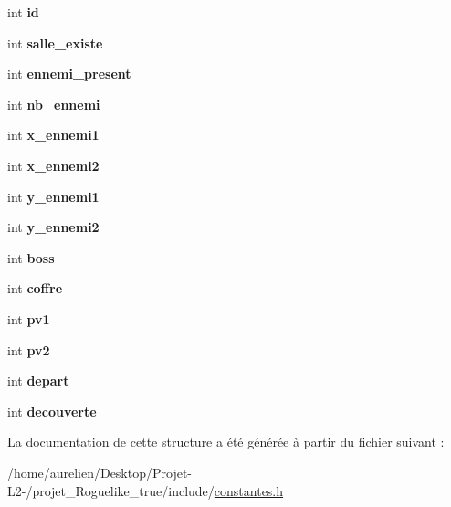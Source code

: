 \begin{DoxyCompactItemize}
\item 
\mbox{\label{structsalle__s_a875e8df0e9b8fd190dc4d210e49a03bb}} 
int {\bfseries id}
\item 
\mbox{\label{structsalle__s_ad82fc1e9e39f7a39b7fc26ea2d01bed3}} 
int {\bfseries salle\+\_\+existe}
\item 
\mbox{\label{structsalle__s_a5b8d8ce1581c10a220e9fb3daeff85fe}} 
int {\bfseries ennemi\+\_\+present}
\item 
\mbox{\label{structsalle__s_aa9b7b9a0e427a86cd11b7d7db6b7ba90}} 
int {\bfseries nb\+\_\+ennemi}
\item 
\mbox{\label{structsalle__s_a40c4f1a128a605b65ec7309af8cba314}} 
int {\bfseries x\+\_\+ennemi1}
\item 
\mbox{\label{structsalle__s_a752545ccd49321820dd57393375c7d0a}} 
int {\bfseries x\+\_\+ennemi2}
\item 
\mbox{\label{structsalle__s_a8929052f0ac9a049dade307c2eb3d442}} 
int {\bfseries y\+\_\+ennemi1}
\item 
\mbox{\label{structsalle__s_acf5b6152ebaf74ac6a5cc2e6ad48de05}} 
int {\bfseries y\+\_\+ennemi2}
\item 
\mbox{\label{structsalle__s_ad17193c93b46d17d67cd46b4e6cec7b4}} 
int {\bfseries boss}
\item 
\mbox{\label{structsalle__s_a77dab6f8e75e2abf315024ecce4a60af}} 
int {\bfseries coffre}
\item 
\mbox{\label{structsalle__s_aefb3569c69744d6ff74ba2c77dd68a4d}} 
int {\bfseries pv1}
\item 
\mbox{\label{structsalle__s_a0b49d0ed35dddea8baebbb3e95030474}} 
int {\bfseries pv2}
\item 
\mbox{\label{structsalle__s_a6e8d9e79a7705096986b49b035841771}} 
int {\bfseries depart}
\item 
\mbox{\label{structsalle__s_a31564b120c85a392581dea2042ab7fa8}} 
int {\bfseries decouverte}
\end{DoxyCompactItemize}


La documentation de cette structure a été générée à partir du fichier suivant \+:\begin{DoxyCompactItemize}
\item 
/home/aurelien/\+Desktop/\+Projet-\/\+L2-\//projet\+\_\+\+Roguelike\+\_\+true/include/\hyperlink{constantes_8h}{constantes.\+h}\end{DoxyCompactItemize}
